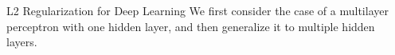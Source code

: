 %
\begin{frame}{L2 Regularization for Deep Learning}
We first consider the case of a multilayer perceptron with one hidden
layer, and then generalize it to multiple hidden layers.
%
%
%
%

\end{frame}
